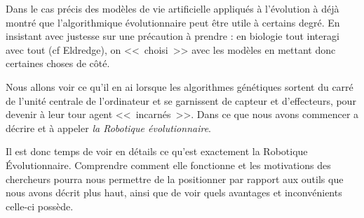 

Dans le cas précis des modèles de vie artificielle appliqués à l'évolution \citet{huneman12computersciencemeetsevolutionarybiologypurepossibleprocessesissuegradualism} à déjà montré que l'algorithmique évolutionnaire peut être utile à certains degré. En insistant avec justesse sur une précaution à prendre : en biologie tout interagi avec tout (cf Eldredge), on <<~choisi~>> avec les modèles en mettant donc certaines choses de côté.

Nous allons voir ce qu'il en ai lorsque les algorithmes génétiques sortent du carré de l'unité centrale de l'ordinateur et se garnissent de capteur et d'effecteurs, pour devenir à leur tour agent <<~incarnés~>>. Dans ce que nous avons commencer a décrire et à appeler \emph{la Robotique évolutionnaire}.




Il est donc temps de voir en détails ce qu'est exactement la Robotique Évolutionnaire. Comprendre comment elle fonctionne et les motivations des chercheurs pourra nous permettre de la positionner par rapport aux outils que nous avons décrit plus haut, ainsi que de voir quels avantages et inconvénients celle-ci possède.

